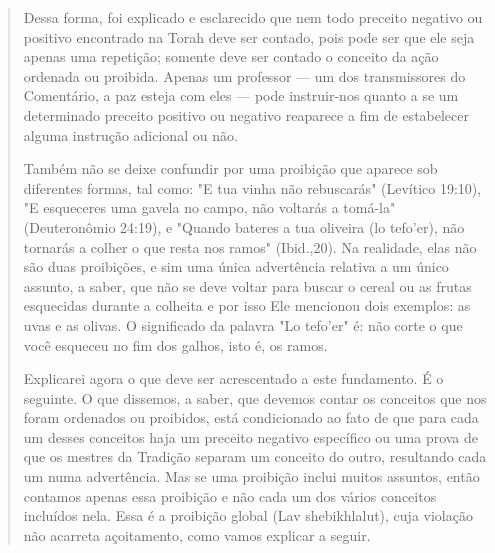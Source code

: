 \begin{quote}

Dessa forma, foi explicado e esclarecido que nem todo preceito ne­gativo
ou positivo encontrado na Torah deve ser contado, pois pode ser que ele
seja apenas uma repetição; somente deve ser contado o conceito da ação
ordenada ou proibida. Apenas um professor --- um dos transmissores do
Co­mentário, a paz esteja com eles --- pode instruir-nos quanto a se um
determina­do preceito positivo ou negativo reaparece a fim de
estabelecer alguma instru­ção adicional ou não.

Também não se deixe confundir por uma proibição que aparece sob
diferentes formas, tal como: "E tua vinha não rebuscarás" (Levítico
19:10), "E esqueceres uma gavela no campo, não voltarás a tomá-la"
(Deuteronômio 24:19), e "Quando bateres a tua oliveira (lo tefo'er), não
tornarás a colher o que resta nos ramos" (Ibid.,20). Na realidade, elas
não são duas proibições, e sim uma única advertência relativa a um único
assunto, a saber, que não se deve voltar para buscar o cereal ou as
frutas esquecidas durante a colheita e por isso Ele mencionou dois
exemplos: as uvas e as olivas. O significado da palavra "Lo te­fo'er" é:
não corte o que você esqueceu no fim dos galhos, isto é, os ramos.

Explicarei agora o que deve ser acrescentado a este fundamento. É o
seguinte. O que dissemos, a saber, que devemos contar os conceitos que
nos foram ordenados ou proibidos, está condicionado ao fato de que para
cada um desses conceitos haja um preceito negativo específico ou uma
prova de que os mestres da Tradição separam um conceito do outro,
resultando cada um nu­ma advertência. Mas se uma proibição inclui muitos
assuntos, então contamos apenas essa proibição e não cada um dos vários
conceitos incluídos nela. Essa é a proibição global (Lav shebikhlalut),
cuja violação não acarreta açoitamento, como vamos explicar a seguir.


\end{quote}
